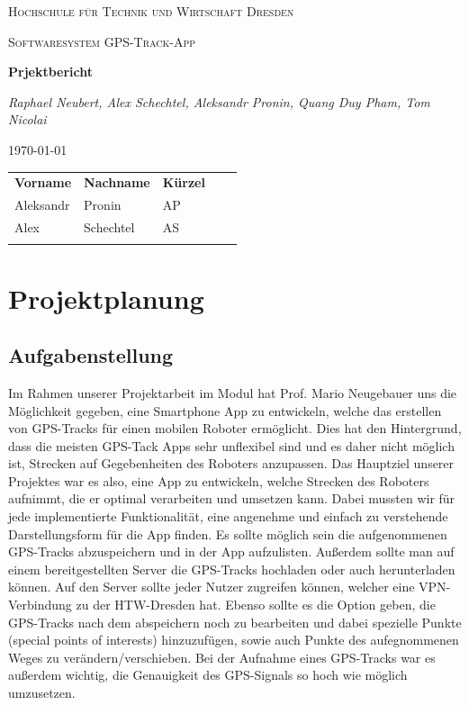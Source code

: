 \documentclass{article}
\begin{document}
\begin{titlepage}
    \centering
    {\scshape\LARGE Hochschule für Technik und Wirtschaft Dresden \par}
    \vspace{1cm}
    {\scshape\Large Softwaresystem \glqq GPS-Track-App\grqq\par}
    \vspace{1.5cm}
    {\huge\bfseries Prjektbericht\par}
    \vspace{2cm}
    {\Large\itshape Raphael Neubert, Alex Schechtel, Aleksandr Pronin, Quang Duy Pham, Tom Nicolai\par}
    \vfill

    {\large \today\par}
\end{titlepage}
\tableofcontents
\newpage
\begin{table}[H]
    \begin{tabular}{lllll}
    \textbf{Vorname} & \textbf{Nachname} & \textbf{Kürzel} &  &  \\
    Aleksandr        & Pronin            & AP              &  &  \\
    Alex             & Schechtel         & AS              &  &  \\
                     &                   &                 &  & 
    \end{tabular}
\end{table}
\section{Projektplanung}
\subsection{Aufgabenstellung}
    Im Rahmen unserer Projektarbeit im Modul  hat Prof. Mario Neugebauer uns die Möglichkeit gegeben,
    eine Smartphone App zu entwickeln, welche das erstellen von GPS-Tracks für einen mobilen 
    Roboter ermöglicht. Dies hat den Hintergrund, dass die meisten GPS-Tack Apps sehr unflexibel sind und es daher nicht 
    möglich ist, Strecken auf Gegebenheiten des Roboters anzupassen. Das Hauptziel unserer Projektes war es also, eine App zu entwickeln, 
    welche Strecken des Roboters aufnimmt, die er optimal verarbeiten und umsetzen kann.
    Dabei mussten wir für jede implementierte Funktionalität,
    eine angenehme und einfach zu verstehende Darstellungsform für die App finden.
    Es sollte möglich sein die aufgenommenen GPS-Tracks abzuspeichern und in der App aufzulisten.
    Außerdem sollte man auf einem bereitgestellten Server die GPS-Tracks hochladen oder auch herunterladen können.
    Auf den Server sollte jeder Nutzer zugreifen können, welcher eine VPN-Verbindung zu der HTW-Dresden hat.
    Ebenso sollte es die Option geben, die GPS-Tracks nach dem abspeichern noch zu bearbeiten und dabei spezielle Punkte (special points of interests) 
    hinzuzufügen, sowie auch Punkte des aufegnommenen Weges zu verändern/verschieben.
    Bei der Aufnahme eines GPS-Tracks war es außerdem wichtig, die Genauigkeit des GPS-Signals so hoch wie möglich umzusetzen. 
\end{document}
